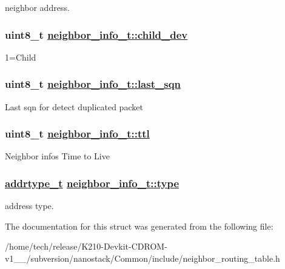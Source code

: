 neighbor address. \hypertarget{structneighbor__info__t_91a0e763d984ae839c8e5e0ed74cb108}{
\subsubsection[child\_\-dev]{\setlength{\rightskip}{0pt plus 5cm}uint8\_\-t \hyperlink{structneighbor__info__t_91a0e763d984ae839c8e5e0ed74cb108}{neighbor\_\-info\_\-t::child\_\-dev}}}
\label{structneighbor__info__t_91a0e763d984ae839c8e5e0ed74cb108}


1=Child \hypertarget{structneighbor__info__t_5298c5fd0a4147b239272dcb5c842922}{
\subsubsection[last\_\-sqn]{\setlength{\rightskip}{0pt plus 5cm}uint8\_\-t \hyperlink{structneighbor__info__t_5298c5fd0a4147b239272dcb5c842922}{neighbor\_\-info\_\-t::last\_\-sqn}}}
\label{structneighbor__info__t_5298c5fd0a4147b239272dcb5c842922}


Last sqn for detect duplicated packet \hypertarget{structneighbor__info__t_4ca0945404f5041f21776c404fb38c88}{
\subsubsection[ttl]{\setlength{\rightskip}{0pt plus 5cm}uint8\_\-t \hyperlink{structneighbor__info__t_4ca0945404f5041f21776c404fb38c88}{neighbor\_\-info\_\-t::ttl}}}
\label{structneighbor__info__t_4ca0945404f5041f21776c404fb38c88}


Neighbor infos Time to Live \hypertarget{structneighbor__info__t_fc0346ec8be9b8c1fd4f30dd92d1668a}{
\subsubsection[type]{\setlength{\rightskip}{0pt plus 5cm}\hyperlink{address_8h_faf76b5591da0abd0584dec411d0551d}{addrtype\_\-t} \hyperlink{structneighbor__info__t_fc0346ec8be9b8c1fd4f30dd92d1668a}{neighbor\_\-info\_\-t::type}}}
\label{structneighbor__info__t_fc0346ec8be9b8c1fd4f30dd92d1668a}


address type. 

The documentation for this struct was generated from the following file:\begin{CompactItemize}
\item 
/home/tech/release/K210-Devkit-CDROM-v1\_\_/subversion/nanostack/Common/include/neighbor\_\-routing\_\-table.h\end{CompactItemize}

